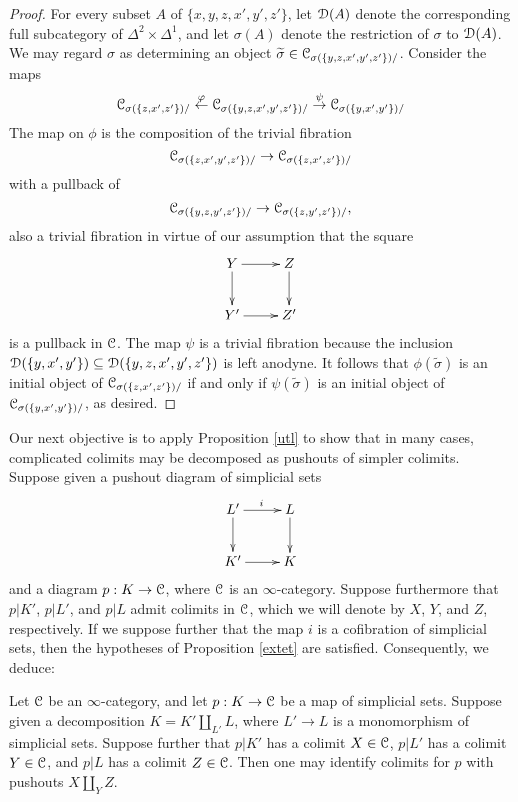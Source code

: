 \begin{proof}
For every subset $A$ of $\{ x,y,z, x', y', z'\}$, let $\operatorname{\mathcal{D}}(A)$ denote the corresponding
full subcategory of $\Delta^2 \times \Delta^1$, and let $\sigma(A)$ denote the restriction of $\sigma$ to $\operatorname{\mathcal{D}}(A)$. We may regard $\sigma$ as determining an object
$\widetilde{\sigma} \in \operatorname{\mathcal{C}}_{\sigma(\{ y,z,x',y',z' \})/}$. Consider the maps
$$ \operatorname{\mathcal{C}}_{ \sigma(\{ z,x',z' \} ) /} \stackrel{\varphi}{\leftarrow}
\operatorname{\mathcal{C}}_{ \sigma(\{ y,z, x',y',z'\})/} \stackrel{\psi}{\rightarrow} \operatorname{\mathcal{C}}_{\sigma(\{ y,x',y' \})/} $$
The map on $\phi$ is the composition of the trivial fibration
$$ \operatorname{\mathcal{C}}_{\sigma(\{ z,x',y',z' \} )/} \rightarrow \operatorname{\mathcal{C}}_{\sigma(\{ z,x',z' \}) /}$$ with a pullback of 
$$\operatorname{\mathcal{C}}_{\sigma( \{y,z,y',z'\} ) /} \rightarrow \operatorname{\mathcal{C}}_{ \sigma( \{z,y',z' \}) /},$$ also a trivial fibration in virtue of our assumption that the square
$$ \xymatrix{ Y \ar[d] \ar[r] & Z \ar[d] \\
Y' \ar[r] & Z' }$$
is a pullback in $\operatorname{\mathcal{C}}$. The map $\psi$ is a trivial fibration because the inclusion
$\operatorname{\mathcal{D}}( \{ y,x',y' \}) \subseteq \operatorname{\mathcal{D}}( \{y,z,x',y',z' \})$ is left anodyne. It follows that
$\phi(\widetilde{\sigma})$ is an initial object of $ \operatorname{\mathcal{C}}_{ \sigma(\{ z,x',z' \} ) /}$
if and only if $\psi(\widetilde{\sigma})$ is an initial object of 
$\operatorname{\mathcal{C}}_{\sigma(\{ y,x',y' \}) /}$, as desired.
\end{proof}

Our next objective is to apply Proposition \ref{utl} to show that
in many cases, complicated colimits may be decomposed as pushouts
of simpler colimits. Suppose given a pushout diagram of simplicial sets
$$ \xymatrix{ L' \ar[r]^{i} \ar[d] & L \ar[d] \\
K' \ar[r] & K }$$
and a diagram $p: K \rightarrow \operatorname{\mathcal{C}}$, where $\operatorname{\mathcal{C}}$ is an $\infty$-category.
Suppose furthermore that $p|K'$, $p|L'$, and $p|L$ admit colimits in $\operatorname{\mathcal{C}}$, which we will denote by $X$, $Y$, and $Z$, respectively. If we suppose further that the map $i$ is a cofibration of simplicial sets, then the hypotheses of Proposition \ref{extet} are satisfied. 
Consequently, we deduce:

\begin{proposition}\label{train}
Let $\operatorname{\mathcal{C}}$ be an $\infty$-category, and let $p: K \rightarrow \operatorname{\mathcal{C}}$ be a map of simplicial
sets. Suppose given a decomposition $K = K' \coprod_{L'} L$, where $L' \rightarrow L$ is a monomorphism of simplicial sets. Suppose further that
$p|K'$ has a colimit $X \in \operatorname{\mathcal{C}}$, $p|L'$ has a colimit $Y \in \operatorname{\mathcal{C}}$, and $p|L$ has
a colimit $Z \in \operatorname{\mathcal{C}}$. Then one may identify colimits for $p$ with
pushouts $X \coprod_{Y} Z$.
\end{proposition}

